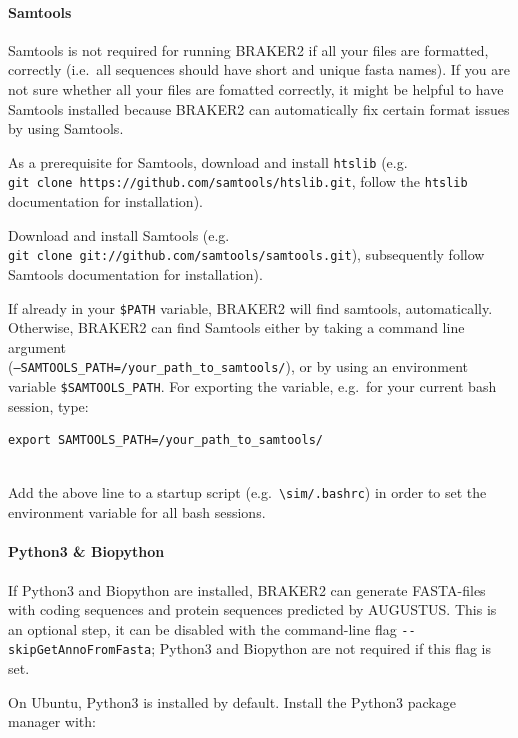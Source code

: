 \documentclass[]{article}
\let\oldparagraph\paragraph
\renewcommand{\paragraph}[1]{\oldparagraph{#1}\mbox{}}
\begin{document}
\paragraph{Samtools}\label{samtools}

Samtools is not required for running BRAKER2 if all your files are
formatted, correctly (i.e.~all sequences should have short and unique
fasta names). If you are not sure whether all your files are fomatted
correctly, it might be helpful to have Samtools installed because
BRAKER2 can automatically fix certain format issues by using Samtools.

As a prerequisite for Samtools, download and install \texttt{htslib}
(e.g.~ \texttt{git\ clone\ https://github.com/samtools/htslib.git},
follow the \texttt{htslib} documentation for installation).

Download and install Samtools (e.g.
\texttt{git\ clone\ git://github.com/samtools/samtools.git}),
subsequently follow Samtools documentation for installation).

If already in your \texttt{\$PATH} variable, BRAKER2 will find samtools,
automatically. Otherwise, BRAKER2 can find Samtools either by taking a
command line argument\\
(\texttt{–SAMTOOLS\_PATH=/your\_path\_to\_samtools/}), or by using an
environment variable \texttt{\$SAMTOOLS\_PATH}. For exporting the
variable, e.g.~for your current bash session, type:

\begin{verbatim}
export SAMTOOLS_PATH=/your_path_to_samtools/
    
\end{verbatim}

Add the above line to a startup script
(e.g.~\texttt{\textbackslash{}sim/.bashrc}) in order to set the
environment variable for all bash sessions.

\paragraph{Python3 \& Biopython}\label{python3-biopython}

If Python3 and Biopython are installed, BRAKER2 can generate FASTA-files
with coding sequences and protein sequences predicted by AUGUSTUS. This
is an optional step, it can be disabled with the command-line flag
\texttt{-\/-skipGetAnnoFromFasta}; Python3 and Biopython are not
required if this flag is set.

On Ubuntu, Python3 is installed by default. Install the Python3 package
manager with:
\end{document}
